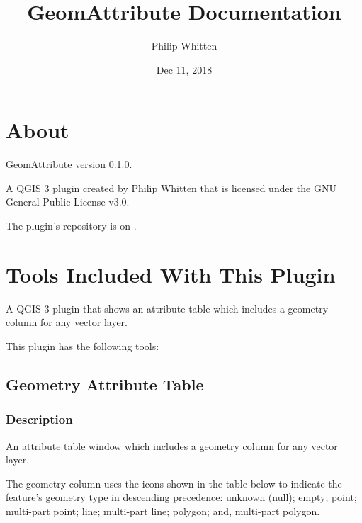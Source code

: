 \documentclass[letterpaper,11pt,english]{sphinxmanual}
\title{GeomAttribute Documentation}
\date{Dec 11, 2018}
\author{Philip Whitten}
\begin{document}
\pagestyle{empty}
\maketitle
\pagestyle{plain}
\sphinxtableofcontents
\pagestyle{normal}
\label{\detokenize{index::doc}}



\chapter{About}
\label{\detokenize{about:about}}\label{\detokenize{about::doc}}
GeomAttribute version 0.1.0.

A QGIS 3 plugin created by Philip Whitten that is licensed under the GNU General Public License v3.0.

The plugin’s repository is on .



\chapter{Tools Included With This Plugin}
\label{\detokenize{pluginTools/index:tools-included-with-this-plugin}}\label{\detokenize{pluginTools/index::doc}}
A QGIS 3 plugin that shows an attribute table which includes a geometry column for any vector layer.

This plugin has the following tools:


\section{Geometry Attribute Table}
\label{\detokenize{pluginTools/geomAttribute:geometry-attribute-table}}\label{\detokenize{pluginTools/geomAttribute:geometryattributetable-page}}\label{\detokenize{pluginTools/geomAttribute::doc}}


\subsection{Description}
\label{\detokenize{pluginTools/geomAttribute:description}}
An attribute table window which includes a geometry column for any vector layer.

The geometry column uses the icons shown in the table below to indicate the feature’s geometry type in descending
precedence: unknown (null); empty; point; multi-part point; line; multi-part line; polygon; and, multi-part polygon.
\end{document}
